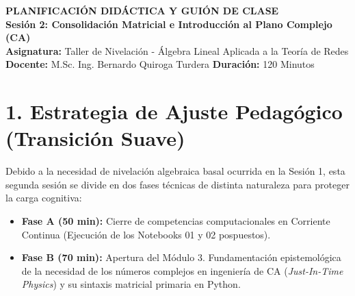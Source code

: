 \documentclass[11pt,a4paper]{article}
\begin{document}
\begin{center}
    {\Large \textbf{\textcolor{UCBblue}{PLANIFICACIÓN DIDÁCTICA Y GUIÓN DE CLASE}}}\\
    \vspace{0.3cm}
    {\large \textbf{Sesión 2: Consolidación Matricial e Introducción al Plano Complejo (CA)}}\\
    \vspace{0.5cm}
    \textbf{Asignatura:} Taller de Nivelación - Álgebra Lineal Aplicada a la Teoría de Redes \\
    \textbf{Docente:} M.Sc. Ing. Bernardo Quiroga Turdera \quad \textbf{Duración:} 120 Minutos
\end{center}

\vspace{0.3cm}

\section*{1. Estrategia de Ajuste Pedagógico (Transición Suave)}
Debido a la necesidad de nivelación algebraica basal ocurrida en la Sesión 1, esta segunda sesión se divide en dos fases técnicas de distinta naturaleza para proteger la carga cognitiva:
\begin{itemize}
    \item \textbf{Fase A (50 min):} Cierre de competencias computacionales en Corriente Continua (Ejecución de los Notebooks 01 y 02 pospuestos).
    \item \textbf{Fase B (70 min):} Apertura del Módulo 3. Fundamentación epistemológica de la necesidad de los números complejos en ingeniería de CA (\textit{Just-In-Time Physics}) y su sintaxis matricial primaria en Python.
\end{itemize}
\end{document}
